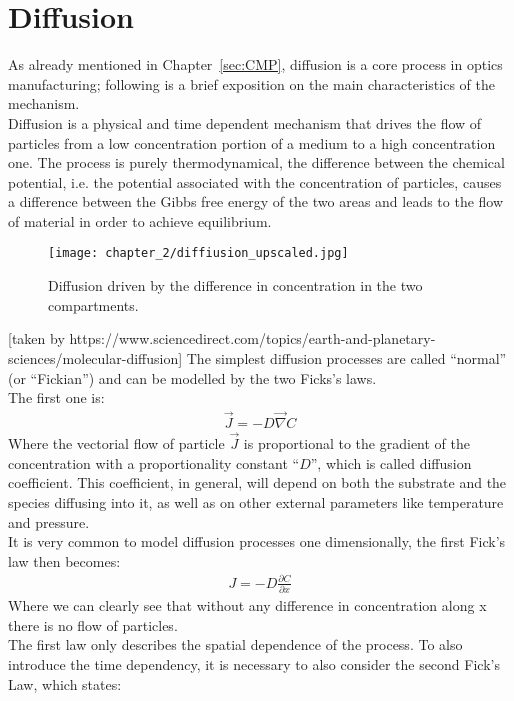 \section{Diffusion}
\label{subsec:diff}

As already mentioned in Chapter~\ref{sec:CMP}, diffusion is a core process in optics manufacturing; following is a brief exposition on the main characteristics of the mechanism.
\\
Diffusion is a physical and time dependent mechanism that drives the flow of particles from a low concentration portion of a medium to a high concentration one. The process is purely thermodynamical, the difference between the chemical potential, i.e. the potential associated with the concentration of particles, causes a difference between the Gibbs free energy of the two areas and leads to the flow of material in order to achieve equilibrium.
\begin{figure}[H]
    \centering
    \texttt{[image: chapter\_2/diffiusion\_upscaled.jpg]}
    \caption[]{Diffusion driven by the difference in concentration in the two compartments.}
    \label{fig:diff_drawing}
\end{figure}
[taken by https://www.sciencedirect.com/topics/earth-and-planetary-sciences/molecular-diffusion]
The simplest diffusion processes are called “normal” (or “Fickian”) and can be modelled by the two Ficks’s laws. 
\\
The first one is:
\begin{align}
    \vec{J}=-D\vec{\nabla}C \label{eq:first_law_3d}
\end{align}
Where the vectorial flow of particle $\vec{J}$ is proportional to the gradient of the concentration with a proportionality constant “$D$”, which is called diffusion coefficient. This coefficient, in general, will depend on both the substrate and the species diffusing into it, as well as on other external parameters like temperature and pressure. 
\\
It is very common to model diffusion processes one dimensionally, the first Fick’s law then becomes:
\begin{align}
    J=-D\frac{\partial C}{\partial x} \label{eq:first_law_1d}
\end{align}
Where we can clearly see that without any difference in concentration along x there is no flow of particles.
\\
The first law only describes the spatial dependence of the process. To also introduce the time dependency, it is necessary to also consider the second Fick’s Law, which states:
